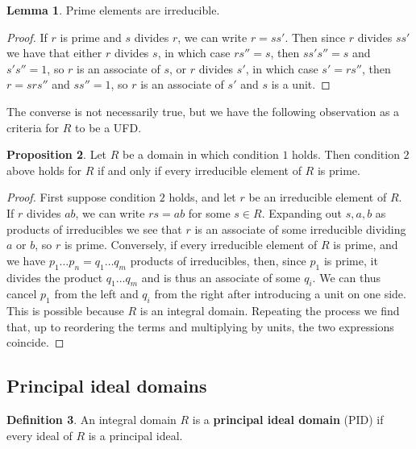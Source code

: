 \documentclass{article}
\theoremstyle{definition}\newtheorem{definition}{Definition}[subsection]
\theoremstyle{definition}\newtheorem{remark}[definition]{Remark}
\theoremstyle{definition}\newtheorem*{example}{Example}
\theoremstyle{definition}\newtheorem*{note}{Note}
\newtheorem{proposition}[definition]{Proposition}
\newtheorem{lemma}[definition]{Lemma}
\begin{document}
\begin{lemma}
Prime elements are irreducible.
\end{lemma}

\begin{proof}
If $ r $ is prime and $ s $ divides $ r $, we can write $ r = ss' $. Then since $ r $ divides $ ss' $ we have that either $ r $ divides $ s $, in which case $ rs'' = s $, then $ ss's'' = s $ and $ s's'' = 1 $, so $ r $ is an associate of $ s $, or $ r $ divides $ s' $, in which case $ s' = rs'' $, then $ r = srs'' $ and $ ss'' = 1 $, so $ r $ is an associate of $ s' $ and $ s $ is a unit.
\end{proof}

The converse is not necessarily true, but we have the following observation as a criteria for $ R $ to be a UFD.

\begin{proposition}
Let $ R $ be a domain in which condition $ 1 $ holds. Then condition $ 2 $ above holds for $ R $ if and only if every irreducible element of $ R $ is prime.
\end{proposition}

\begin{proof}
First suppose condition $ 2 $ holds, and let $ r $ be an irreducible element of $ R $. If $ r $ divides $ ab $, we can write $ rs = ab $ for some $ s \in R $. Expanding out $ s, a, b $ as products of irreducibles we see that $ r $ is an associate of some irreducible dividing $ a $ or $ b $, so $ r $ is prime. Conversely, if every irreducible element of $ R $ is prime, and we have $ p_1 \dots p_n = q_1 \dots q_m $ products of irreducibles, then, since $ p_1 $ is prime, it divides the product $ q_1 \dots q_m $ and is thus an associate of some $ q_i $. We can thus cancel $ p_1 $ from the left and $ q_i $ from the right after introducing a unit on one side. This is possible because $ R $ is an integral domain. Repeating the process we find that, up to reordering the terms and multiplying by units, the two expressions coincide.
\end{proof}

\subsection{Principal ideal domains}

\begin{definition}
An integral domain $ R $ is a \textbf{principal ideal domain} (PID) if every ideal of $ R $ is a principal ideal.
\end{definition}
\end{document}
